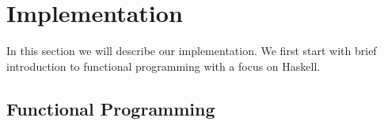 \chapter{Implementation}
\label{chap:implementation}

In this section we will describe our implementation. We first start with brief introduction to functional programming with a focus on Haskell.

\section{Functional Programming}
